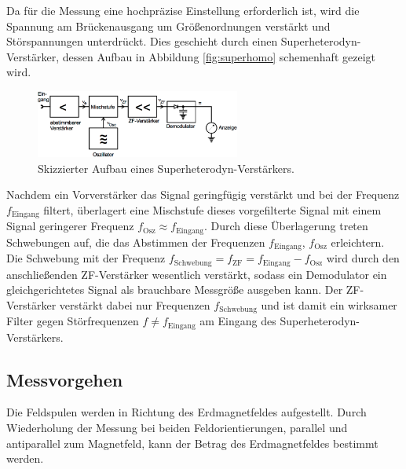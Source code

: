 Da für die Messung eine hochpräzise Einstellung erforderlich ist,
wird die Spannung am Brückenausgang um Größenordnungen verstärkt und Störspannungen
unterdrückt. Dies geschieht durch einen Superheterodyn-Verstärker, dessen Aufbau
in Abbildung \ref{fig:superhomo} schemenhaft gezeigt wird.
\begin{figure}
  \centering
  \includegraphics[width=0.6\textwidth]{graphics/superhomo.png}
  \caption{Skizzierter Aufbau eines Superheterodyn-Verstärkers. \cite{skript}}
  \label{fig:energieaufspaltung}
\end{figure}
Nachdem ein Vorverstärker das Signal geringfügig verstärkt und bei der Frequenz
$f_\text{Eingang}$ filtert, überlagert eine Mischstufe dieses vorgefilterte Signal
mit einem Signal geringerer Frequenz $f_\text{Osz}\approx f_\text{Eingang}$. Durch diese
Überlagerung treten Schwebungen auf, die das Abstimmen der Frequenzen
$f_\text{Eingang}$, $f_\text{Osz}$ erleichtern.
Die Schwebung mit der Frequenz $f_\text{Schwebung}=f_\text{ZF}=f_\text{Eingang}-f_\text{Osz}$
wird durch den anschließenden ZF-Verstärker wesentlich verstärkt, sodass ein Demodulator
ein gleichgerichtetes Signal als brauchbare Messgröße ausgeben kann. Der ZF-Verstärker
verstärkt dabei nur Frequenzen $f_\text{Schwebung}$ und ist damit ein wirksamer Filter
gegen Störfrequenzen $f\neq f_\text{Eingang}$ am Eingang des Superheterodyn-Verstärkers.

\subsection{Messvorgehen}
Die Feldspulen werden in Richtung des Erdmagnetfeldes aufgestellt. Durch Wiederholung
der Messung bei beiden Feldorientierungen, parallel und antiparallel zum Magnetfeld,
kann der Betrag des Erdmagnetfeldes bestimmt werden.

